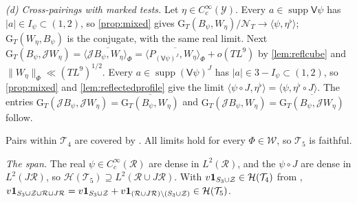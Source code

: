 \documentclass[11pt,colorlinks]{charlie}
\newcommand{\ip}[2]{\langle #1,#2\rangle}
\begin{document}
\emph{(d) Cross-pairings with marked tests.} Let $\eta\in C_c^\infty(\mathcal Y)$. Every $a\in\operatorname{supp}\mathsf V\psi$ has $|a|\in I_\psi\subset(1,2)$, so \cref{prop:mixed} gives $\mathrm G_T(B_\psi,W_\eta)/\mathcal N_T\to\ip{\psi}{\eta^\flat}$; $\mathrm G_T(W_\eta,B_\psi)$ is the conjugate, with the same real limit. Next $\mathrm G_T(B_\psi,\mathcal JW_\eta)=\overline{\ip{\mathcal JB_\psi}{W_\eta}_\Phi}=\overline{\ip{P_{(\mathsf V\psi)^J}}{W_\eta}_\Phi}+o(TL^9)$ by \cref{lem:reflcube} and $\|W_\eta\|_\Phi\ll(TL^9)^{1/2}$. Every $a\in\operatorname{supp}(\mathsf V\psi)^J$ has $|a|\in3-I_\psi\subset(1,2)$, so \cref{prop:mixed} and \cref{lem:reflectedprofile} give the limit $\ip{\psi\circ J}{\eta^\flat}=\ip\psi{\eta^\flat\circ J}$. The entries $\mathrm G_T(\mathcal JB_\psi,\mathcal JW_\eta)=\overline{\mathrm G_T(B_\psi,W_\eta)}$ and $\mathrm G_T(\mathcal JB_\psi,W_\eta)=\overline{\mathrm G_T(B_\psi,\mathcal JW_\eta)}$ follow.

Pairs within $\mathcal T_4$ are covered by . All limits hold for every $\Phi\in\mathcal W$, so $\mathcal T_5$ is faithful.

\emph{The span.} The real $\psi\in C_c^\infty(\mathcal R)$ are dense in $L^2(\mathcal R)$, and the $\psi\circ J$ are dense in $L^2(J\mathcal R)$, so $\mathcal H(\mathcal T_5)\supseteq L^2(\mathcal R\cup J\mathcal R)$. With $v\mathbf{1}_{S_3\cup\mathcal Z}\in\mathcal H(\mathcal T_4)$ from , $v\mathbf{1}_{S_3\cup\mathcal Z\cup\mathcal R\cup J\mathcal R}=v\mathbf{1}_{S_3\cup\mathcal Z}+v\mathbf{1}_{(\mathcal R\cup J\mathcal R)\setminus(S_3\cup\mathcal Z)}\in\mathcal H(\mathcal T_5)$.
\end{document}
